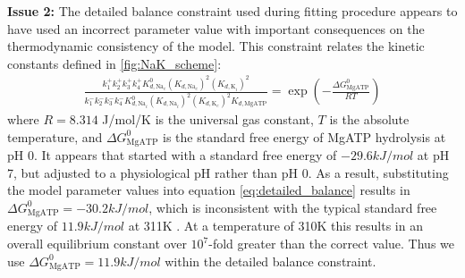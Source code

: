 \documentclass[11pt]{article}
\begin{document}
\textbf{Issue 2:} The detailed balance constraint used during fitting procedure appears to have used an incorrect parameter value with important consequences on the thermodynamic consistency of the model. This constraint relates the kinetic constants defined in \autoref{fig:NaK_scheme}:
\begin{align}
	\frac{k_1^+ k_2^+ k_3^+ k_4^+ K_{d,\text{Na}_e}^0(K_{d,\text{Na}_e})^2 (K_{d,\text{K}_i})^2}
  {k_1^- k_2^- k_3^- k_4^- K_{d,\text{Na}_i}^0 (K_{d,\text{Na}_i})^2 (K_{d,\text{K}_e})^2 K_{d,\text{MgATP}}} = \exp\left( -\frac{\Delta G_\text{MgATP}^0}{RT} \right)
  \label{eq:detailed_balance}
\end{align}
where $R=8.314$ J/mol/K is the universal gas constant, $T$ is the absolute temperature, and $\Delta G_\mathrm{MgATP}^0$ is the standard free energy of MgATP hydrolysis at pH 0. It appears that \citet{terkildsen_balance_2007} started with a standard free energy of $-29.6\si{kJ/mol}$ at pH 7, but adjusted to a physiological pH rather than pH 0. As a result, substituting the model parameter values into equation \eqref{eq:detailed_balance} results in $\Delta G_\mathrm{MgATP}^0 = -30.2\si{kJ/mol}$, which is inconsistent with the typical standard free energy of $11.9\si{kJ/mol}$ at 311K \citep{tran_thermodynamic_2009,guynn_equilibrium_1973}. At a temperature of 310K this results in an overall equilibrium constant over $10^7$-fold greater than the correct value. Thus we use $\Delta G_\mathrm{MgATP}^0 = 11.9\si{kJ/mol}$ within the detailed balance constraint.
\end{document}
